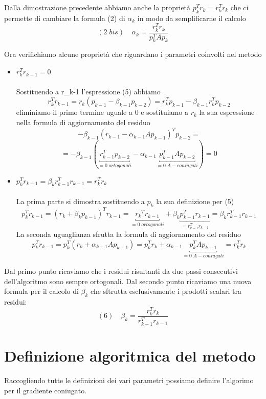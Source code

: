 Dalla dimostrazione precedente abbiamo anche la proprietà
$p_{k}^{T}r_{k}=r_{k}^{T}r_{k}$ che ci permette di cambiare la formula
(2) di $\alpha_{k}$ in modo da semplificarne il calcolo
$$
(2\; bis) \quad \alpha_{k}=\frac{r_{k}^{T}r_{k}}{p_{k}^{T}Ap_{k}}
$$

Ora verifichiamo alcune proprietà che riguardano i parametri coinvolti
nel metodo
\begin{itemize}
\item $r_{k}^{T} r_{k-1}=0$\\ \\ Sostituendo a r_{k-1} l'espressione
(5) abbiamo
$$r_{k}^{T} r_{k-1} =r_{k} (p_{k-1} - \beta _{k-1} p_{k-2}) =
r_{k}^{T} p_{k-1} - \beta_{k-1}r_{k}^{T} p_{k-2}$$ eliminiamo il primo
termine uguale a 0 e sostituiamo a $r_{k}$ la sua espressione nella
formula di aggiornamento del residuo
 $$ -\beta_{k-1} (r_{k-1} - \alpha_{k-1} A p_{k-1})^{T} p_{k-2}= $$
$$  = -\beta_{k-1} (\underbracket{r_{k-1}^{T} p_{k-2}}_{= 0\;ortogonali} - \alpha_{k-1} \underbracket{p_{k-1}^{T} A p_{k-2}}_{ = 0\; A-coniugati})=0
$$

\item $p_{k}^{T} r_{k-1} = \beta_{k} r_{k-1}^{T} r_{k-1} = r_{k}^{T}
r_{k}$ \\ \\ La prima parte si dimostra sostituendo a $p_{k}$ la sua
definizione per (5)
$$p_{k}^{T} r_{k-1} = 
(r_{k} + \beta_{k} p_{k-1})^{T}r_{k-1} = \underbracket{{r_k}^{T}
r_{k-1}}_{= 0 \; ortogonali} + \beta_k \underbracket{p_{k-1}^{T} r
_{k-1}}_{=r_{k-1}^{T}r_{k-1}} = \beta_{k} r_{k-1}^{T} r_{k-1}
$$
La seconda uguaglianza sfrutta la formula di aggiornamento del residuo
$$ p_{k}^{T}r_{k-1}= p_{k}^{T} (r_{k} + \alpha_{k-1} A p_{k-1}) = p_{k}^{T}r_{k} + 
  \alpha_{k-1} \underbracket{p_{k}^{T} A p_{k-1}}_{= 0\; A-coniugati}
= r_{k}^{T} r_{k}$$

\end{itemize} Dal primo punto ricaviamo che i residui risultanti da
due passi consecutivi dell'algoritmo sono sempre ortogonali.  Dal
secondo punto ricaviamo una nuova formula per il calcolo di
$\beta_{k}$ che sftrutta esclusivamente i prodotti scalari tra
residui:
$$ (6)\quad \beta_{k} = \frac{r_{k}^{T}r_{k}}{r_{k-1}^{T}r_{k-1}}$$ 

\section{Definizione algoritmica del metodo}

Raccogliendo tutte le definizioni dei vari parametri possiamo definire
l'algorimo per il gradiente coniugato.

